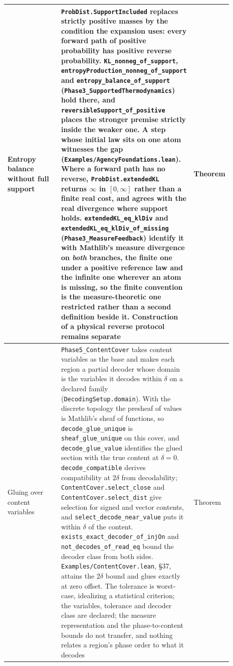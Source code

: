 \documentclass{article}
\begin{document}
\begin{longtable}{|>{\raggedright\arraybackslash}p{0.26\linewidth}|>{\raggedright\arraybackslash}p{0.46\linewidth}|>{\raggedright\arraybackslash}p{0.17\linewidth}|}
Entropy balance without full support & \texttt{ProbDist.SupportIncluded} replaces strictly positive masses by the condition the expansion uses: every forward path of positive probability has positive reverse probability. \nolinkurl{KL_nonneg_of_support}, \nolinkurl{entropyProduction_nonneg_of_support} and \nolinkurl{entropy_balance_of_support} (\nolinkurl{Phase3_SupportedThermodynamics}) hold there, and \nolinkurl{reversibleSupport_of_positive} places the stronger premise strictly inside the weaker one. A step whose initial law sits on one atom witnesses the gap (\texttt{Examples/AgencyFoundations.lean}). Where a forward path has no reverse, \texttt{ProbDist.extendedKL} returns $\infty$ in $[0,\infty]$ rather than a finite real cost, and agrees with the real divergence where support holds. \nolinkurl{extendedKL_eq_klDiv} and \nolinkurl{extendedKL_eq_klDiv_of_missing} (\nolinkurl{Phase3_MeasureFeedback}) identify it with Mathlib's measure divergence on \emph{both} branches, the finite one under a positive reference law and the infinite one wherever an atom is missing, so the finite convention is the measure-theoretic one restricted rather than a second definition beside it. Construction of a physical reverse protocol remains separate & Theorem \\ \hline
Gluing over content variables & \nolinkurl{Phase5_ContentCover} takes content variables as the base and makes each region a partial decoder whose domain is the variables it decodes within $\delta$ on a declared family (\texttt{DecodingSetup.domain}). With the discrete topology the presheaf of values is Mathlib's sheaf of functions, so \nolinkurl{decode_glue_unique} is \nolinkurl{sheaf_glue_unique} on this cover, and \nolinkurl{decode_glue_value} identifies the glued section with the true content at $\delta=0$. \nolinkurl{decode_compatible} derives compatibility at $2\delta$ from decodability; \nolinkurl{ContentCover.select_close} and \nolinkurl{ContentCover.select_dist} give selection for signed and vector contents, and \nolinkurl{select_decode_near_value} puts it within $\delta$ of the content. \nolinkurl{exists_exact_decoder_of_injOn} and \nolinkurl{not_decodes_of_read_eq} bound the decoder class from both sides. \nolinkurl{Examples/ContentCover.lean}, \S37, attains the $2\delta$ bound and glues exactly at zero offset. The tolerance is worst-case, idealizing a statistical criterion; the variables, tolerance and decoder class are declared; the measure representation and the phase-to-content bounds do not transfer, and nothing relates a region's phase order to what it decodes & Theorem \\ \hline

\end{longtable}
\end{document}
